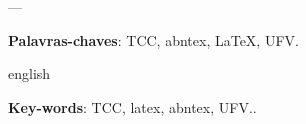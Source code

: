 \documentclass[
	12pt,				    %
	openright,			    %
	oneside,			    %
	a4paper,			    %
    sumario=tradicional,    %
	english,			    %
	brazil,				    %
	]{abntex2}              %
\begin{document}
\frenchspacing

\pretextual

\imprimircapa

\imprimirfolhaderosto




 ---



\begin{resumo}
 \noindent
 

 \vspace{\onelineskip}

 \noindent
 \textbf{Palavras-chaves}: TCC, abntex, LaTeX, UFV.
\end{resumo}

\begin{resumo}[Abstract]
 \begin{otherlanguage*}{english}
   \noindent
%
   \vspace{\onelineskip}

   \noindent
   \textbf{Key-words}: TCC, latex, abntex, UFV..
 \end{otherlanguage*}
\end{resumo}
\end{document}
